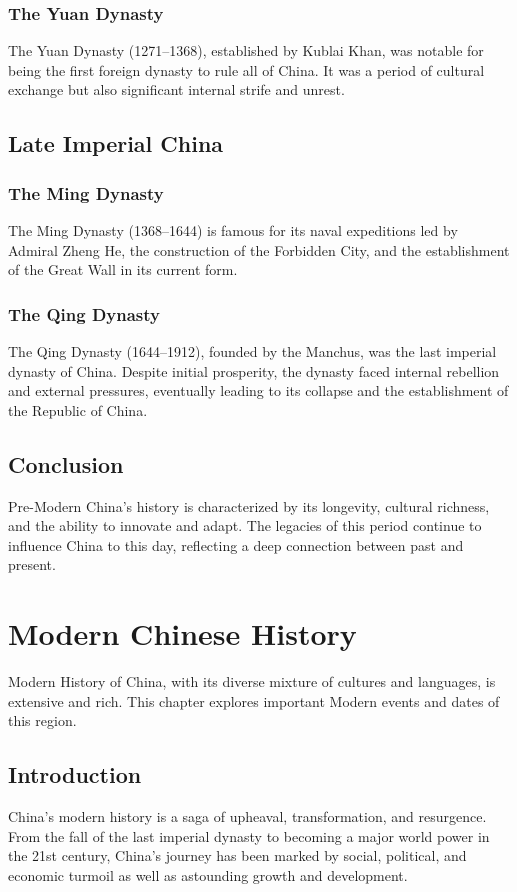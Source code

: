 \documentclass[a4paper,12pt]{book}
\begin{document}
\subsection{The Yuan Dynasty}
The Yuan Dynasty (1271–1368), established by Kublai Khan, was notable for being the first foreign dynasty to rule all of China. It was a period of cultural exchange but also significant internal strife and unrest.

\section{Late Imperial China}
\subsection{The Ming Dynasty}
The Ming Dynasty (1368–1644) is famous for its naval expeditions led by Admiral Zheng He, the construction of the Forbidden City, and the establishment of the Great Wall in its current form.

\subsection{The Qing Dynasty}
The Qing Dynasty (1644–1912), founded by the Manchus, was the last imperial dynasty of China. Despite initial prosperity, the dynasty faced internal rebellion and external pressures, eventually leading to its collapse and the establishment of the Republic of China.

\section{Conclusion}
Pre-Modern China's history is characterized by its longevity, cultural richness, and the ability to innovate and adapt. The legacies of this period continue to influence China to this day, reflecting a deep connection between past and present.

\chapter{Modern Chinese History}
\label{ch:modern-chinese-history}

Modern History of China, with its diverse mixture of cultures and languages, is extensive and rich. This chapter explores important Modern events and dates of this region.

\section{Introduction}
\label{sec:introduction}
China's modern history is a saga of upheaval, transformation, and resurgence. From the fall of the last imperial dynasty to becoming a major world power in the 21st century, China's journey has been marked by social, political, and economic turmoil as well as astounding growth and development.
\end{document}
